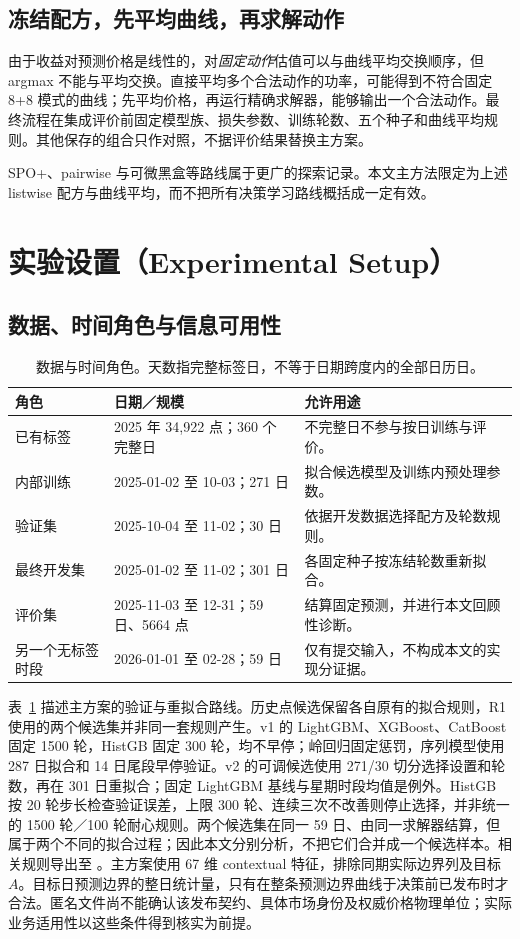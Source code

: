 \documentclass[11pt,a4paper]{article}
\begin{document}
\subsection{冻结配方，先平均曲线，再求解动作}
\EqMean
由于收益对预测价格是线性的，对\emph{固定动作}估值可以与曲线平均交换顺序，但 argmax 不能与平均交换。直接平均多个合法动作的功率，可能得到不符合固定 8+8 模式的曲线；先平均价格，再运行精确求解器，能够输出一个合法动作。最终流程在集成评价前固定模型族、损失参数、训练轮数、五个种子和曲线平均规则。其他保存的组合只作对照，不据评价结果替换主方案。

SPO+、pairwise 与可微黑盒等路线属于更广的探索记录。本文主方法限定为上述 listwise 配方与曲线平均，而不把所有决策学习路线概括成一定有效。
\FloatBarrier

\section{实验设置（Experimental Setup）}
\subsection{数据、时间角色与信息可用性}
\begin{table}[!htbp]\centering\small
\caption{数据与时间角色。天数指完整标签日，不等于日期跨度内的全部日历日。}\label{tab:data}
\begin{tabularx}{\linewidth}{@{}p{.17\linewidth}p{.30\linewidth}X@{}}\toprule
角色 & 日期／规模 & 允许用途 \\\midrule
已有标签 & 2025 年 34,922 点；360 个完整日 & 不完整日不参与按日训练与评价。 \\
内部训练 & 2025-01-02 至 10-03；271 日 & 拟合候选模型及训练内预处理参数。 \\
验证集 & 2025-10-04 至 11-02；30 日 & 依据开发数据选择配方及轮数规则。 \\
最终开发集 & 2025-01-02 至 11-02；301 日 & 各固定种子按冻结轮数重新拟合。 \\
评价集 & 2025-11-03 至 12-31；59 日、5664 点 & 结算固定预测，并进行本文回顾性诊断。 \\
另一个无标签时段 & 2026-01-01 至 02-28；59 日 & 仅有提交输入，不构成本文的实现分证据。 \\\bottomrule
\end{tabularx}\end{table}

表~\ref{tab:data} 描述主方案的验证与重拟合路线。历史点候选保留各自原有的拟合规则，R1 使用的两个候选集并非同一套规则产生。v1 的 LightGBM、XGBoost、CatBoost 固定 1500 轮，HistGB 固定 300 轮，均不早停；岭回归固定惩罚，序列模型使用 287 日拟合和 14 日尾段早停验证。v2 的可调候选使用 271/30 切分选择设置和轮数，再在 301 日重拟合；固定 LightGBM 基线与星期时段均值是例外。HistGB 按 20 轮步长检查验证误差，上限 300 轮、连续三次不改善则停止选择，并非统一的 1500 轮／100 轮耐心规则。两个候选集在同一 59 日、由同一求解器结算，但属于两个不同的拟合过程；因此本文分别分析，不把它们合并成一个候选样本。相关规则导出至 。主方案使用 67 维 contextual 特征，排除同期实际边界列及目标 $A$。目标日预测边界的整日统计量，只有在整条预测边界曲线于决策前已发布时才合法。匿名文件尚不能确认该发布契约、具体市场身份及权威价格物理单位；实际业务适用性以这些条件得到核实为前提。
\end{document}
